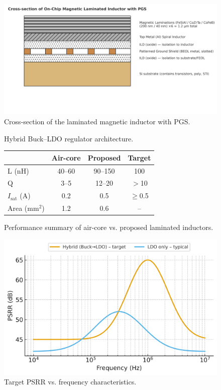 \documentclass[conference]{IEEEtran}
\begin{document}

\begin{figure}[t]
  \centering
  \includegraphics[width=0.48\columnwidth]{fig1_laminated_cross_section.png}
  \caption{Cross-section of the laminated magnetic inductor with PGS.}
  \label{fig1}
\end{figure}

\begin{figure}[t]
  \centering
  \caption{Hybrid Buck--LDO regulator architecture.}
  \label{fig2}
\end{figure}

\begin{figure}[t]
  \centering
  \begin{tabular}{lccc}
    \toprule
    & Air-core & Proposed & Target \\
    \midrule
    L (nH) & 40--60 & 90--150 & 100 \\
    Q      & 3--5   & 12--20  & $>$10 \\
    $I_\text{sat}$ (A) & 0.2 & 0.5 & $\geq$0.5 \\
    Area (mm$^2$) & 1.2 & 0.6 & -- \\
    \bottomrule
  \end{tabular}
  \caption{Performance summary of air-core vs. proposed laminated inductors.}
  \label{fig3}
\end{figure}

\begin{figure}[t]
  \centering
  \includegraphics[width=0.48\columnwidth]{fig4_psrr_target.png}
  \caption{Target PSRR vs. frequency characteristics.}
  \label{fig4}
\end{figure}
\end{document}
